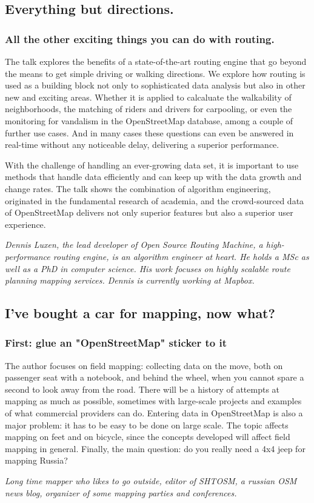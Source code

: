 \newcommand{\talkabstract}[4]%
{%
\newpage%
\subsection*{#1}%
\subsubsection*{#2}%
#4 \par%
\emph{#3}%
}

\newcommand{\talkabstractwithoutsub}[3]%
{%
\newpage%
\subsection*{#1}%
#3 \par%
\emph{#2}%
}

\talkabstract{Everything but directions.}%
{All the other exciting things you can do with routing.}%
{Dennis Luxen, the lead developer of Open Source Routing Machine, a high-performance routing engine, is an algorithm engineer at heart. He holds a MSc as well as a PhD in computer science. His work focuses on highly scalable route planning mapping services. Dennis is currently working at Mapbox. }%
{The talk explores the benefits of a state-of-the-art routing engine that go beyond the means to get simple driving or walking directions. We explore how 
routing is used as a building block not only to sophisticated data analysis but also in other new and exciting areas. Whether it is applied to calcaluate the walkability of neighborhoods, the matching of riders and drivers for carpooling, or even the monitoring for vandalism in the OpenStreetMap database, 
among a couple of further use cases. And in many cases these questions can even be answered in real-time without any noticeable delay, delivering a superior performance.

With the challenge of handling an ever-growing data set, it is important to use methods that handle data efficiently and can keep up with the data growth and change rates. The talk shows the combination of algorithm engineering, originated in the fundamental research of academia, and the crowd-sourced data 
of OpenStreetMap delivers not only superior features but also a superior user experience.}

\talkabstract{I've bought a car for mapping, now what?}%
{First: glue an "OpenStreetMap" sticker to it}%
{Long time mapper who likes to go outside, editor of SHTOSM, a russian OSM news blog, organizer of some mapping parties and conferences. }%
{The author focuses on field mapping: collecting data on the move, both on passenger seat with a notebook, and behind the wheel, when you cannot spare a second to look away from the road. There will be a history of attempts at mapping as much as possible, sometimes with large-scale projects and examples of what commercial providers can do. Entering data in OpenStreetMap is also a major problem: it has to be easy to be done on large scale. The topic affects mapping on feet and on bicycle, since the concepts developed will affect field mapping in general. Finally, the main question: do you really need a 4x4 jeep for mapping Russia?}

